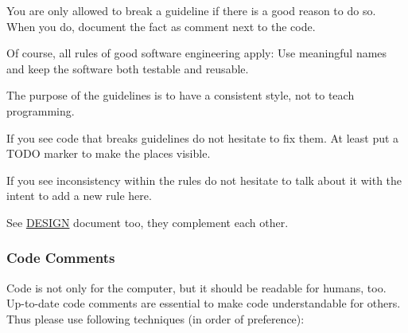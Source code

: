 You are only allowed to break a guideline if there is a good reason to do so. When you do, document the fact as comment next to the code.

Of course, all rules of good software engineering apply\+: Use meaningful names and keep the software both testable and reusable.

The purpose of the guidelines is to have a consistent style, not to teach programming.

If you see code that breaks guidelines do not hesitate to fix them. At least put a T\+O\+D\+O marker to make the places visible.

If you see inconsistency within the rules do not hesitate to talk about it with the intent to add a new rule here.

See \hyperlink{doc_DESIGN_md}{D\+E\+S\+I\+G\+N} document too, they complement each other.

\subsubsection*{Code Comments}

Code is not only for the computer, but it should be readable for humans, too. Up-\/to-\/date code comments are essential to make code understandable for others. Thus please use following techniques (in order of preference)\+:


